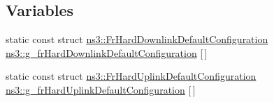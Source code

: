 \subsection*{Variables}
\begin{DoxyCompactItemize}
\item 
static const struct \hyperlink{structns3_1_1FrHardDownlinkDefaultConfiguration}{ns3\+::\+Fr\+Hard\+Downlink\+Default\+Configuration} \hyperlink{namespacens3_a81d038ac21b2a5f174c121f016632f21}{ns3\+::g\+\_\+fr\+Hard\+Downlink\+Default\+Configuration} \mbox{[}$\,$\mbox{]}
\item 
static const struct \hyperlink{structns3_1_1FrHardUplinkDefaultConfiguration}{ns3\+::\+Fr\+Hard\+Uplink\+Default\+Configuration} \hyperlink{namespacens3_a7c11930be582ce88ce6627e2b0204570}{ns3\+::g\+\_\+fr\+Hard\+Uplink\+Default\+Configuration} \mbox{[}$\,$\mbox{]}
\end{DoxyCompactItemize}
